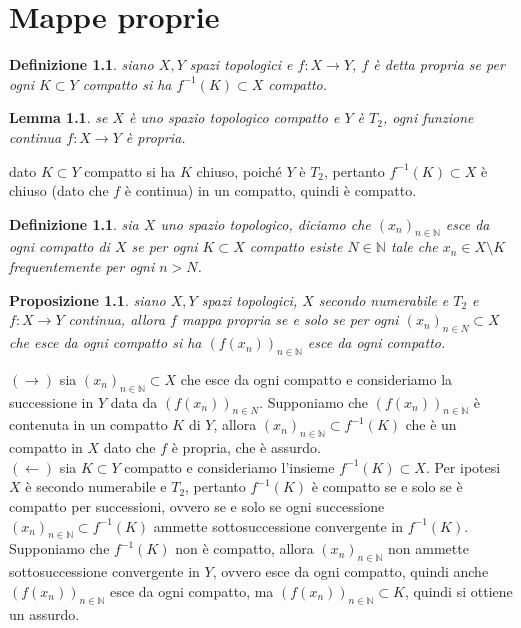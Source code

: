 \documentclass[oneside, 11pt]{amsbook}
\makeatletter
\newcommand{\co}[1]{\textit{#1}}
\newcommand{\N}{{\mathbb N}}
\newcommand{\0}{{(0)}}
\newcommand{\3}{{(3)}}
\theoremstyle{colonplain}
\newtheorem{prop}[thm]{Proposizione}
\newtheorem{lemma}[thm]{Lemma}
\theoremstyle{colondefinition}
\newtheorem{defn}[thm]{Definizione}
\theoremstyle{colonremark}
\numberwithin{equation}{chapter}
\renewcommand{\proofname}{Dimostrazione}
\renewenvironment{proof}[1][\proofname]{\par
  \pushQED{\qed}%
  \normalfont \topsep6\p@\@plus6\p@\relax
  \trivlist
  \item[\hskip\labelsep\bfseries #1:]\ignorespaces
}{%
  \popQED\endtrivlist\@endpefalse
}
\makeatother
\begin{document}
\chapter{Mappe proprie}
\begin{defn}
    siano $X, Y$ spazi topologici e $f : X \longrightarrow Y$, $f$ è detta \co{propria} se per ogni $K \subset Y$ compatto si ha $f^{-1}(K) \subset X$ compatto.
\end{defn}
\begin{lemma}
    se $X$ è uno spazio topologico compatto e $Y$ è $T_2$, ogni funzione continua $f : X \longrightarrow Y$ è propria.
\end{lemma}
\begin{proof}
    dato $K \subset Y$ compatto si ha $K$ chiuso, poiché $Y$ è $T_2$, pertanto $f^{-1}(K) \subset X$ è chiuso (dato che $f$ è continua) in un compatto, quindi è compatto.
\end{proof}
\begin{defn}
    sia $X$ uno spazio topologico, diciamo che $(x_n)_{n \in \N}$ \co{esce da ogni compatto di} $X$ se per ogni $K \subset X$ compatto esiste $N \in \N$ tale che $x_n \in X \setminus K$ \co{frequentemente} per ogni $n > N$.
\end{defn}
\begin{prop}
    siano $X, Y$ spazi topologici, $X$ secondo numerabile e $T_2$ e $f : X \longrightarrow Y$ continua, allora $f$ mappa propria se e solo se per ogni $(x_n)_{n \in N} \subset X$ che esce da ogni compatto si ha $(f(x_n))_{n \in \N}$ esce da ogni compatto.
\end{prop}
\begin{proof}
    $(\rightarrow)$ sia $(x_n)_{n \in \N} \subset X$ che esce da ogni compatto e consideriamo la successione in $Y$ data da $(f(x_n))_{n \in N}$. Supponiamo che $(f(x_n))_{n \in \N}$ è contenuta in un compatto $K$ di $Y$, allora $(x_n)_{n \in \N} \subset f^{-1}(K)$ che è un compatto in $X$ dato che $f$ è propria, che è assurdo. \\
    $(\leftarrow)$ sia $K \subset Y$ compatto e consideriamo l'insieme $f^{-1}(K) \subset X$. Per ipotesi $X$ è secondo numerabile e $T_2$, pertanto $f^{-1}(K)$ è compatto se e solo se è compatto per successioni, ovvero se e solo se ogni successione $(x_n)_{n \in \N} \subset f^{-1}(K)$ ammette sottosuccessione convergente in $f^{-1}(K)$. Supponiamo che $f^{-1}(K)$ non è compatto, allora $(x_n)_{n \in \N}$ non ammette sottosuccessione convergente in $Y$, ovvero esce da ogni compatto, quindi anche $(f(x_n))_{n \in \N}$ esce da ogni compatto, ma $(f(x_n))_{n \in \N} \subset K$, quindi si ottiene un assurdo.
\end{proof}
\end{document}
